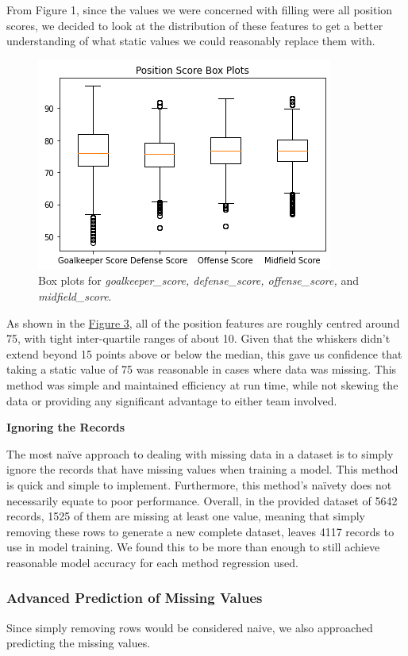 \documentclass[8pt]{article}
\begin{document}
From Figure 1, since the values we were concerned with filling were all position scores, we decided to look at the distribution of these features to get a better understanding of what static values we could reasonably replace them with.

\begin{figure}[H]
    \centering
    \includegraphics[scale=.6]{box_plots.png}
    \caption{Box plots for \textit{goalkeeper\_score, defense\_score, offense\_score,} and \textit{midfield\_score}.}
    \label{fig:boxplots}
\end{figure}
As shown in the \hyperref[fig:boxplots]{Figure 3}, all of the position features are roughly centred around 75, with tight inter-quartile ranges of about 10. Given that the whiskers didn't extend beyond 15 points above or below the median, this gave us confidence that taking a static value of 75 was reasonable in cases where data was missing. This method was simple and maintained efficiency at run time, while not skewing the data or providing any significant advantage to either team involved.

\textbf{Ignoring the Records}\vspace{0.05cm}

The most naïve approach to dealing with missing data in a dataset is to simply ignore the records that have missing values when training a model. This method is quick and simple to implement. Furthermore, this method's naïvety does not necessarily equate to poor performance. Overall, in the provided dataset of 5642 records, 1525 of them are missing at least one value, meaning that simply removing these rows to generate a new complete dataset, leaves 4117 records to use in model training. We found this to be more than enough to still achieve reasonable model accuracy for each method regression used.

\subsubsection{Advanced Prediction of Missing Values}
Since simply removing rows would be considered naive, we also approached predicting the missing values.
\end{document}
